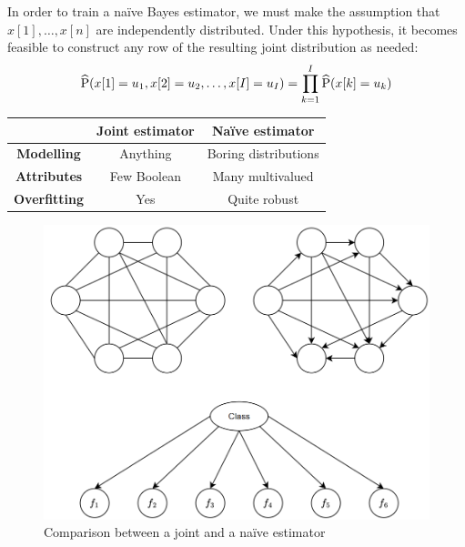 In order to train a naïve Bayes estimator, we must make the assumption that $x[1],\dots,x[n]$ are independently distributed. 
Under this hypothesis, it becomes feasible to construct any row of the resulting joint distribution as needed:
\[\widehat{\textnormal{P}}(x[1]=u_1,x[2]=u_2,\dots,x[I]=u_I) = \prod_{k=1}^{I} \widehat{\textnormal{P}}(x[k]=u_k)\]
\begin{table}[H]
    \centering
    \begin{tabular}{c|c|c|}
    \cline{2-3}
                                                & \textbf{Joint estimator} & \textbf{Naïve estimator} \\ \hline
    \multicolumn{1}{|c|}{\textbf{Modelling}}   & Anything                 & Boring distributions     \\ 
    \multicolumn{1}{|c|}{\textbf{Attributes}}  & Few Boolean              & Many multivalued         \\ 
    \multicolumn{1}{|c|}{\textbf{Overfitting}} & Yes                      & Quite robust             \\ \hline
    \end{tabular}
\end{table}
\begin{figure}[H]
    \centering
    \includegraphics[width=0.5\linewidth]{images/naive-joint.png}
    \caption{Comparison between a joint and a naïve estimator}
\end{figure}